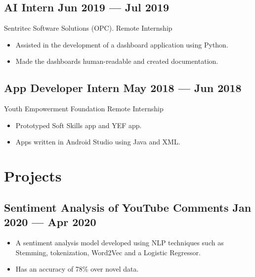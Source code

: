 \documentclass[a4,10pt]{article}
\newcommand{\subtext}[1]{
#1\par\vspace{-0.2cm}}
\newenvironment{zitemize}{
\begin{itemize}\itemsep0pt \parskip0pt \parsep1pt}
{\end{itemize}\vspace{-0.5cm}}
\begin{document}
\subsection*{AI Intern \hfill Jun 2019 --- Jul 2019} 
\subtext{Sentritec Software Solutions (OPC). \hfill Remote Internship} 
    \begin{zitemize}
        \item Assisted in the development of a dashboard application using Python.
        \item Made the dashboards human-readable and created documentation.
    \end{zitemize}

\subsection*{App Developer Intern  \hfill May 2018 --- Jun 2018} 
\subtext{Youth Empowerment Foundation \hfill Remote Internship} 
    \begin{zitemize}
        \item Prototyped Soft Skills app and YEF app.
        \item Apps written in Android Studio using Java and XML.
    \end{zitemize}



\section{Projects} %


\subsection*{Sentiment Analysis of YouTube Comments \hfill Jan 2020 --- Apr 2020} 
    \begin{zitemize}
        \item A sentiment analysis model developed using NLP techniques such as Stemming, tokenization, Word2Vec and a Logistic Regressor.
        \item Has an accuracy of 78\% over novel data.
    \end{zitemize}
\end{document}
